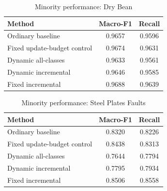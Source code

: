 \begin{table}[t]
\caption{Minority performance: Dry Bean}
\label{tab:dry-bean-minority}
\centering
\begin{tabular}{lcc}
\toprule Method & Macro-F1 & Recall\\
\midrule
Ordinary baseline & 0.9657 & 0.9596\\
Fixed update-budget control & 0.9674 & 0.9631\\
Dynamic all-classes & 0.9633 & 0.9561\\
Dynamic incremental & 0.9646 & 0.9585\\
Fixed incremental & 0.9688 & 0.9639\\
\bottomrule
\end{tabular}
\end{table}
\begin{table}[t]
\caption{Minority performance: Steel Plates Faults}
\label{tab:steel-plates-minority}
\centering
\begin{tabular}{lcc}
\toprule Method & Macro-F1 & Recall\\
\midrule
Ordinary baseline & 0.8320 & 0.8226\\
Fixed update-budget control & 0.8438 & 0.8313\\
Dynamic all-classes & 0.7644 & 0.7794\\
Dynamic incremental & 0.7795 & 0.7934\\
Fixed incremental & 0.8506 & 0.8558\\
\bottomrule
\end{tabular}
\end{table}
